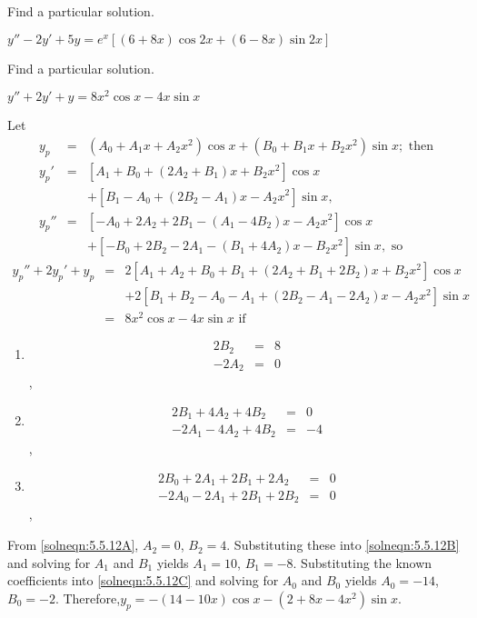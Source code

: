 \documentclass{ximera}
\begin{document}
\begin{problem}\label{exer:5.5.11} Find a particular solution. 

$y''-2y'+5y=e^x\left[(6+8x)\cos
2x+(6-8x)\sin2x\right]$
\end{problem}

\begin{problem}\label{exer:5.5.12} Find a particular solution. 

$y''+2y'+y=8x^2\cos x-4x\sin x$

\begin{solution}
Let
\begin{eqnarray*}
y_p&=&(A_0+A_1x+A_2x^2)\cos x +(B_0+B_1x+B_2x^2)\sin x;\text{ then}\\
y_p'&=&\left[A_1+B_0+(2A_2+B_1)x+B_2x^2\right]\cos x\\ &&
+\left[B_1-A_0+(2B_2-A_1)x-A_2x^2\right]\sin x, \\
y_p''&=&\left[-A_0+2A_2+2B_1-(A_1-4B_2)x-A_2x^2\right]\cos x\\ &&+
\left[-B_0+2B_2-2A_1-(B_1+4A_2)x-B_2x^2\right]\sin x,\text{ so}
\end{eqnarray*}
\begin{eqnarray*}
y_p''+2y_p'+y_p&=&2\left[A_1+A_2+B_0+B_1+(2A_2+B_1+2B_2)x+
B_2x^2\right]\cos x\\ && +
2\left[B_1+B_2-A_0-A_1+(2B_2-A_1-2A_2)x-A_2x^2\right]\sin x\\
&=&8x^2\cos x-4x\sin x \text{ if}
\end{eqnarray*}

\begin{enumerate}
    \item\label{solneqn:5.5.12A} \begin{eqnarray*}
    2B_2 &=& 8\\-2A_2 &=&
    0
    \end{eqnarray*},

    \item\label{solneqn:5.5.12B} \begin{eqnarray*}
    2B_1+4A_2+4B_2 &=& 0 \\ -2A_1-4A_2+4B_2 &=& -4
    \end{eqnarray*},

    \item \label{solneqn:5.5.12C} \begin{eqnarray*}
    2B_0+2A_1+2B_1+2A_2 &=& 0
\\ -2A_0-2A_1+2B_1+2B_2 &=& 0
    \end{eqnarray*},
\end{enumerate}


From \ref{solneqn:5.5.12A}, $A_2=0$, $B_2=4$. Substituting these into \ref{solneqn:5.5.12B} and solving
for $A_1$ and $B_1$ yields $A_1=10$, $B_1=-8$. Substituting the known
coefficients into \ref{solneqn:5.5.12C} and solving for $A_0$ and $B_0$ yields
$A_0=-14$, $B_0=-2$. Therefore,$y_p=-(14-10x)\cos x-(2+8x-4x^2)\sin
x$.

\end{solution}
\end{problem}
\end{document}
